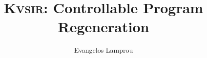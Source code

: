 \documentclass[sigplan]{acmart}
\def\eg{{\em e.g.}, }
\newcommand{\sys}{{\scshape Kv{\textalpha}sir}\xspace}
\begin{document}
\title{\sys: Controllable Program Regeneration}
\author{Evangelos Lamprou}




\begin{abstract}
\end{abstract}



\maketitle
\end{document}
